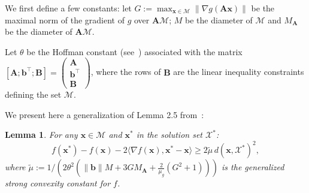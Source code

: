 \documentclass{article} %
\newtheorem{lemma}[definition]{Lemma}
\newcommand{\X}{\mathcal{X}}
\newcommand{\domain}{\mathcal{M}} %
\newcommand{\x}{\bm{x}}
\newcommand{\A}{\bm{A}}
\newcommand{\B}{\bm{B}}
\newcommand{\bv}{\bm{b}}
\newcommand{\0}{\mathbf{0}} %
\begin{document}
We first define a few constants: let $G := \max_{\x \in \domain} \| \nabla g
(\A \x) \|$ be the maximal norm of the gradient of $g$ over $\A \domain$; $M$
be the diameter of $\domain$ and $M_{\A}$ be the diameter of $\A \domain$.

Let $\theta$ be the Hoffman constant (see~\citep[Lemma 2.2]{Beck:2015vo})
associated with the matrix $[\A ; \bv^\top; \B] = \left(\substack{\A \\ \bv^\top \\ \B}\right)$, where the rows of $\B$ are the linear inequality constraints defining the set $\domain$.

We present here a generalization of Lemma 2.5 from~\citep{Beck:2015vo}:
\begin{lemma}\label{lem:generalizedStrongConvexity}
For any $\x \in \domain$ and $\x^*$ in the solution set $\X^*$:
\begin{equation}
f(\x^*)- f(\x)- 2 \langle\nabla f(\x), \x^*-\x \rangle \geq 2 \tilde{\mu} \, d(\x, \X^*)^2 ,
\end{equation}
where $\tilde{\mu} := 1/\left(2 \theta^2 \left( \|\bv \| M + 3 G M_{\A} + \frac{2}{\mu_g} (G^2+1) \right) \right)$ is the generalized strong convexity constant for $f$.
\end{lemma}
\end{document}
